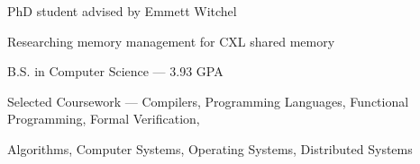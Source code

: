\documentclass{resume}
\begin{document}
\begin{education}
	\begin{description}
		\item PhD student advised by Emmett Witchel
		\item Researching memory management for CXL shared memory
	\end{description}

	\begin{description}
		\item B.S. in Computer Science --- 3.93 GPA
		\item Selected Coursework ---
		      Compilers,
		      Programming Languages,
		      Functional Programming,
		      Formal Verification,

		      Algorithms,
		      Computer Systems,
		      Operating Systems,
		      Distributed Systems
	\end{description}
\end{education}
\end{document}
